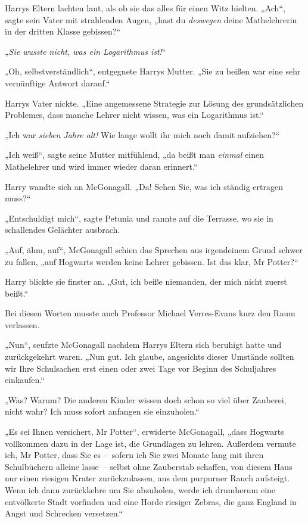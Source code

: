 {Harrys Eltern lachten laut, als ob sie das alles für einen Witz hielten. „Ach“, sagte sein Vater mit strahlenden Augen, „hast du \emph{deswegen} deine Mathelehrerin in der dritten Klasse gebissen?“

„\emph{Sie wusste nicht, was ein Logarithmus ist!}“

„Oh, selbstverständlich“, entgegnete Harrys Mutter. „Sie zu beißen war eine sehr vernünftige Antwort darauf.“

Harrys Vater nickte. „Eine angemessene Strategie zur Lösung des grundsätzlichen Problemes, dass manche Lehrer nicht wissen, was ein Logarithmus ist.“

„Ich war \emph{sieben Jahre alt!} Wie lange wollt ihr mich noch damit aufziehen?“

„Ich weiß“, sagte seine Mutter mitfühlend, „da beißt man \emph{einmal} einen Mathelehrer und wird immer wieder daran erinnert.“

Harry wandte sich an McGonagall. „Da! Sehen Sie, was ich ständig ertragen muss?“

„Entschuldigt mich“, sagte Petunia und rannte auf die Terrasse, wo sie in schallendes Gelächter ausbrach.

„Auf, ähm, auf“, McGonagall schien das Sprechen aus irgendeinem Grund schwer zu fallen, „auf Hogwarts werden keine Lehrer gebissen. Ist das klar, Mr Potter?“

Harry blickte sie finster an. „Gut, ich beiße niemanden, der mich nicht zuerst beißt.“

Bei diesen Worten musste auch Professor Michael Verres-Evans kurz den Raum verlassen.

„Nun“, seufzte McGonagall nachdem Harrys Eltern sich beruhigt hatte und zurückgekehrt waren. „Nun gut. Ich glaube, angesichts dieser Umstände sollten wir Ihre Schulsachen erst einen oder zwei Tage vor Beginn des Schuljahres einkaufen.“

„Was? Warum? Die anderen Kinder wissen doch schon so viel über Zauberei, nicht wahr? Ich muss sofort anfangen sie einzuholen.“

„Es sei Ihnen versichert, Mr Potter“, erwiderte McGonagall, „dass Hogwarts vollkommen dazu in der Lage ist, die Grundlagen zu lehren. Außerdem vermute ich, Mr Potter, dass Sie es --~sofern ich Sie zwei Monate lang mit ihren Schulbüchern alleine lasse~-- selbst ohne Zauberstab schaffen, von diesem Haus nur einen riesigen Krater zurückzulassen, aus dem purpurner Rauch aufsteigt. Wenn ich dann zurückkehre um Sie abzuholen, werde ich drumherum eine entvölkerte Stadt vorfinden und eine Horde riesiger Zebras, die ganz England in Angst und Schrecken versetzen.“

}
